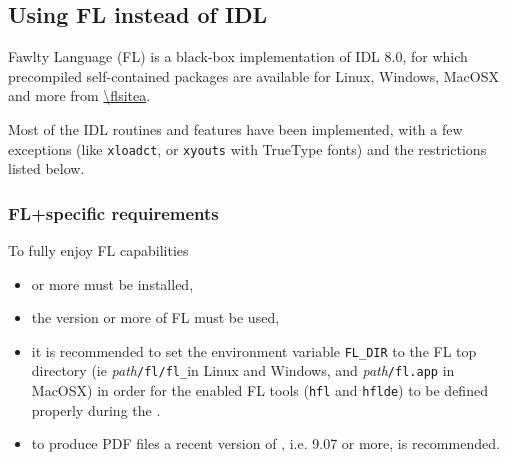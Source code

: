 \documentclass[12pt,twoside]{article}
\makeatletter
\newcommand{\nop}[1]{\Hy@raisedlink{\hypertarget{#1}{}}}
\newcommand{\mytarget}[1]{\nop{#1}}%
\newcommand{\mytarget}[1]{\label{#1}}
\makeatother
\begin{document}

\subsection{Using FL instead of IDL}
\label{sec:using_fl}
\label{install:using_fl}
\mytarget{install:using_fl}
Fawlty Language (FL) is a black-box implementation of IDL 8.0, for which precompiled self-contained packages
are available for Linux, Windows, MacOSX and more from 
\url{\flsitea}.

Most of the IDL routines and features have been implemented, with a few exceptions 
(like \texttt{xloadct}, or \texttt{xyouts} with TrueType fonts) and the restrictions listed below.

\subsubsection*{FL+\healpix specific requirements}
To fully enjoy FL capabilities
\begin{itemize}
\item \healpix \hpxversion{} or more must be installed,
%
\item the version \flversion or more of FL must be used,
%
\item it is recommended to set the environment variable \texttt{FL\_DIR} to the FL top directory (ie {\em path}\texttt{/fl/fl\_\flversion}in Linux and Windows, and {\em path}\texttt{/fl.app} in MacOSX) 
in order for the \healpix enabled FL tools (\texttt{hfl} and \texttt{hflde}) to be defined properly during the
.
%
\item to produce PDF files
a recent version of , i.e. 9.07 or more, is recommended.
%
\end{itemize}
\end{document}
